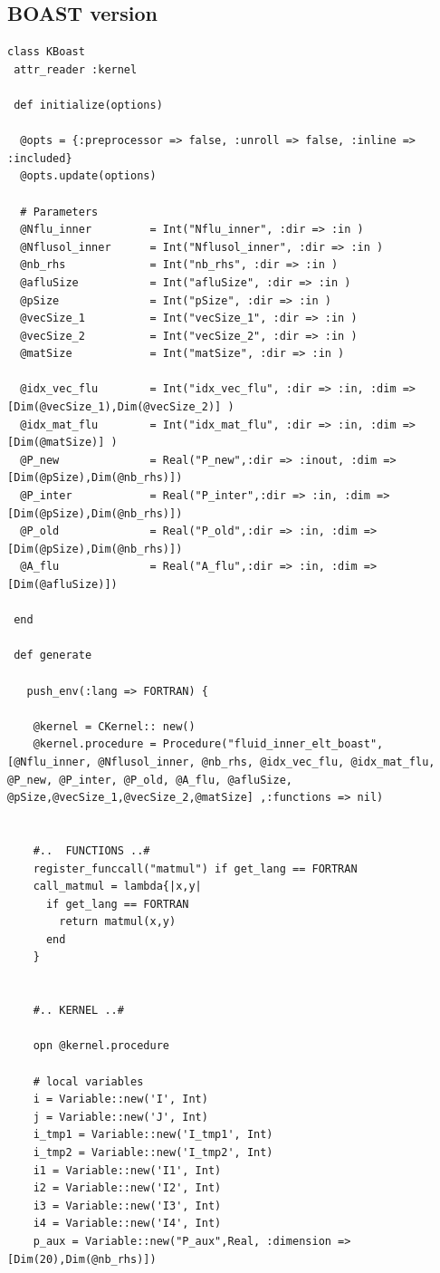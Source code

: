 \documentclass[10pt,twoside]{article}   	%
\begin{document}
\subsection{BOAST version}

\lstset{language=RUBY}
\begin{lstlisting}[caption=KBoast.rb]
class KBoast
 attr_reader :kernel

 def initialize(options)

  @opts = {:preprocessor => false, :unroll => false, :inline => :included}
  @opts.update(options)

  # Parameters 
  @Nflu_inner         = Int("Nflu_inner", :dir => :in )
  @Nflusol_inner      = Int("Nflusol_inner", :dir => :in )
  @nb_rhs             = Int("nb_rhs", :dir => :in )
  @afluSize           = Int("afluSize", :dir => :in )
  @pSize              = Int("pSize", :dir => :in )
  @vecSize_1          = Int("vecSize_1", :dir => :in )
  @vecSize_2          = Int("vecSize_2", :dir => :in )
  @matSize            = Int("matSize", :dir => :in )

  @idx_vec_flu        = Int("idx_vec_flu", :dir => :in, :dim => [Dim(@vecSize_1),Dim(@vecSize_2)] )
  @idx_mat_flu        = Int("idx_mat_flu", :dir => :in, :dim => [Dim(@matSize)] )
  @P_new              = Real("P_new",:dir => :inout, :dim => [Dim(@pSize),Dim(@nb_rhs)])
  @P_inter            = Real("P_inter",:dir => :in, :dim => [Dim(@pSize),Dim(@nb_rhs)])
  @P_old              = Real("P_old",:dir => :in, :dim => [Dim(@pSize),Dim(@nb_rhs)])
  @A_flu              = Real("A_flu",:dir => :in, :dim => [Dim(@afluSize)])

 end

 def generate

   push_env(:lang => FORTRAN) {

    @kernel = CKernel:: new()
    @kernel.procedure = Procedure("fluid_inner_elt_boast",[@Nflu_inner, @Nflusol_inner, @nb_rhs, @idx_vec_flu, @idx_mat_flu, @P_new, @P_inter, @P_old, @A_flu, @afluSize, @pSize,@vecSize_1,@vecSize_2,@matSize] ,:functions => nil)


    #..  FUNCTIONS ..#
    register_funccall("matmul") if get_lang == FORTRAN
    call_matmul = lambda{|x,y|
      if get_lang == FORTRAN
        return matmul(x,y)
      end
    }


    #.. KERNEL ..#

    opn @kernel.procedure

    # local variables
    i = Variable::new('I', Int)
    j = Variable::new('J', Int)
    i_tmp1 = Variable::new('I_tmp1', Int)
    i_tmp2 = Variable::new('I_tmp2', Int)
    i1 = Variable::new('I1', Int)
    i2 = Variable::new('I2', Int)
    i3 = Variable::new('I3', Int)
    i4 = Variable::new('I4', Int)
    p_aux = Variable::new("P_aux",Real, :dimension => [Dim(20),Dim(@nb_rhs)])


\end{lstlisting}
\end{document}
